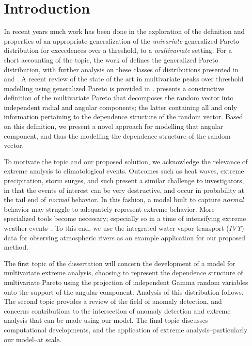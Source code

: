 
\section{Introduction}
In recent years much work has been done in the exploration of the definition and properties of an
  appropriate generalization of the \emph{univariate} generalized Pareto distribution for exceedences
  over a threshold, to a \emph{multivariate} setting.  For a short accounting of the topic, the work of
  \cite{rootzen2006} defines the generalized Pareto distribution, with further analysis on these classes
  of distributions presented in \cite{falk2008} and \cite{michel2008}.  A recent review of the state
  of the art in multivariate peaks over threshold modelling using generalized Pareto is provided in
  \cite{rootzen2018}.  \cite{ferreira2014} presents a constructive definition of the multivariate Pareto
  that decomposes the random vector into independent radial and angular components; the latter
  containing all and only information pertaining to the dependence structure of the random vector.
  Based on this definition, we present a novel approach for modelling that angular component, and thus
  the modelling the dependence structure of the random vector.

To motivate the topic and our proposed solution, we acknowledge the relevance of extreme analysis to
  climatological events.  Outcomes such as heat waves, extreme precipitation, storm surges, and
  such present a similar challenge to investigators, in that the events of interest can be very destructive,
  and occur in probability at the tail end of \emph{normal} behavior.  In this fashion, a model built
  to capture \emph{normal} behavior may struggle to adequately represent extreme behavior.  More
  specialized tools become necessary; especially so in a time of intensifying extreme weather
  events~\citep{jentsch2007,vousdoukas2018,li2019}.  To this end, we use the integrated water vapor
  transport (\emph{IVT}) data for observing atmospheric rivers as an example application for our proposed method.

The first topic of the dissertation will concern the development of a model for multivariate extreme analysis,
  choosing to represent the dependence structure of multivariate Pareto using the projection of independent
  Gamma random variables onto the support of the angular component.  Analysis of this distribution follows.
  The second topic provides a review of the field of anomaly detection, and concerns contributions
  to the intersection of anomaly detection and extreme analysis that can be made using our model.
  The final topic discusses computational developments, and the application of extreme
  analysis--particularly our model--at scale.

